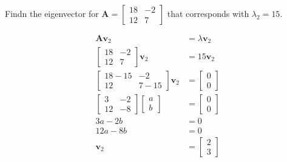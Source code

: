 Findn the eigenvector for $\boldsymbol{A} = \begin{bmatrix}18 & -2 \\ 12 & 7\end{bmatrix}$ that corresponds with $\lambda_2 = 15$.

\begin{solution}
    \begin{align*}
        \boldsymbol{Av}_2 &= \lambda\boldsymbol{v}_2 \\
        \begin{bmatrix}
            18 & -2 \\
            12 & 7
        \end{bmatrix}\boldsymbol{v}_2 &= 15\boldsymbol{v}_2 \\
        \begin{bmatrix}
            18-15 & -2 \\
            12 & 7-15
        \end{bmatrix}\boldsymbol{v}_2 &= \begin{bmatrix}
            0 \\ 0
        \end{bmatrix} \\
        \begin{bmatrix}
            3 & -2 \\
            12 & -8
        \end{bmatrix}\begin{bmatrix}
            a \\ b
        \end{bmatrix} &= \begin{bmatrix}
            0 \\ 0
        \end{bmatrix} \\
        3a - 2b &= 0 \\
        12a - 8b &= 0 \\
        \boldsymbol{v}_2 &= \begin{bmatrix}
            2 \\ 3
        \end{bmatrix}
    \end{align*}
\end{solution}